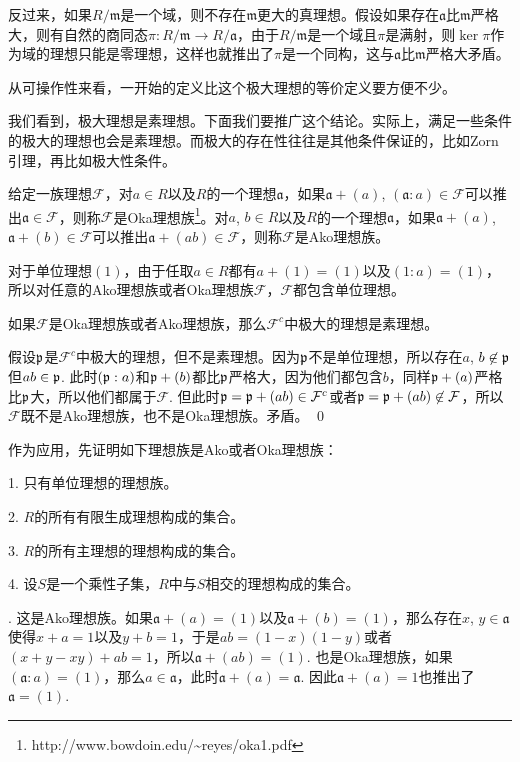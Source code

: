 反过来，如果$R/\mathfrak{m}$是一个域，则不存在$\mathfrak{m}$更大的真理想。假设如果存在$\mathfrak{a}$比$\mathfrak{m}$严格大，则有自然的商同态$\pi:R/\mathfrak{m}\to R/\mathfrak{a}$，由于$R/\mathfrak{m}$是一个域且$\pi$是满射，则$\ker \pi$作为域的理想只能是零理想，这样也就推出了$\pi$是一个同构，这与$\mathfrak{a}$比$\mathfrak{m}$严格大矛盾。

从可操作性来看，一开始的定义比这个极大理想的等价定义要方便不少。

\para 我们看到，极大理想是素理想。下面我们要推广这个结论。实际上，满足一些条件的极大的理想也会是素理想。而极大的存在性往往是其他条件保证的，比如Zorn引理，再比如极大性条件。

给定一族理想$\mathcal{F}$，对$a\in R$以及$R$的一个理想$\mathfrak{a}$，如果$\mathfrak{a}+(a)$, $(\mathfrak{a}:a)\in \mathcal{F}$可以推出$\mathfrak{a}\in \mathcal{F}$，则称$\mathcal{F}$是Oka理想族\footnote{http://www.bowdoin.edu/\~{}reyes/oka1.pdf}。对$a$, $b\in R$以及$R$的一个理想$\mathfrak{a}$，如果$\mathfrak{a}+(a)$, $\mathfrak{a}+(b)\in \mathcal{F}$可以推出$\mathfrak{a}+(ab)\in \mathcal{F}$，则称$\mathcal{F}$是Ako理想族。

对于单位理想$(1)$，由于任取$a\in R$都有$a+(1)=(1)$以及$(1:a)=(1)$，所以对任意的Ako理想族或者Oka理想族$\mathcal{F}$，$\mathcal{F}$都包含单位理想。

\pro 如果$\mathcal{F}$是Oka理想族或者Ako理想族，那么$\mathcal{F}^c$中极大的理想是素理想。

\proof
	假设$\mathfrak{p}$是$\mathcal{F}^c$中极大的理想，但不是素理想。因为$\mathfrak{p}$不是单位理想，所以存在$a$, $b\not\in \mathfrak{p}$但$ab\in\mathfrak{p}$. 此时$(\mathfrak{p}:a)$和$\mathfrak{p}+(b)$都比$\mathfrak{p}$严格大，因为他们都包含$b$，同样$\mathfrak{p}+(a)$严格比$\mathfrak{p}$大，所以他们都属于$\mathcal{F}$. 但此时$\mathfrak{p}=\mathfrak{p}+(ab)\in \mathcal{F}^c$或者$\mathfrak{p}=\mathfrak{p}+(ab)\not\in \mathcal{F}$，所以$\mathcal{F}$既不是Ako理想族，也不是Oka理想族。矛盾。
\qed

作为应用，先证明如下理想族是Ako或者Oka理想族：

1. 只有单位理想的理想族。

2. $R$的所有有限生成理想构成的集合。

3. $R$的所有主理想的理想构成的集合。

4. 设$S$是一个乘性子集，$R$中与$S$相交的理想构成的集合。

. 这是Ako理想族。如果$\mathfrak{a}+(a)=(1)$以及$\mathfrak{a}+(b)=(1)$，那么存在$x$, $y\in \mathfrak{a}$使得$x+a=1$以及$y+b=1$，于是$ab=(1-x)(1-y)$或者$(x+y-xy)+ab=1$，所以$\mathfrak{a}+(ab)=(1)$. 也是Oka理想族，如果$(\mathfrak{a}:a)=(1)$，那么$a\in \mathfrak{a}$，此时$\mathfrak{a}+(a)=\mathfrak{a}$. 因此$\mathfrak{a}+(a)=1$也推出了$\mathfrak{a}=(1)$.

